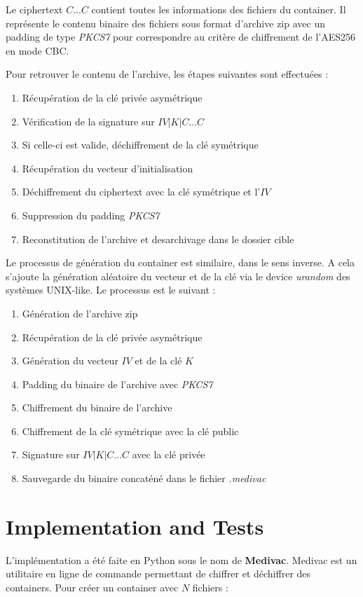 \documentclass[a4paper]{report}
\begin{document}
Le ciphertext $C...C$ contient toutes les informations des fichiers du container. Il représente le contenu binaire des fichiers sous format d'archive zip avec un padding de type \textit{PKCS7} pour correspondre au critère de chiffrement de l'AES256 en mode CBC.

Pour retrouver le contenu de l'archive, les étapes suivantes sont effectuées :

\begin{enumerate}
    \item{Récupération de la clé privée asymétrique}
    \item{Vérification de la signature sur $IV|K|C...C$}
    \item{Si celle-ci est valide, déchiffrement de la clé symétrique}
    \item{Récupération du vecteur d'initialisation}
    \item{Déchiffrement du ciphertext avec la clé symétrique et l'$IV$}
    \item{Suppression du padding \textit{PKCS7}}
    \item{Reconstitution de l'archive et desarchivage dans le dossier cible}
\end{enumerate}

Le processus de génération du container est similaire, dans le sens inverse. A cela s'ajoute la génération aléatoire du vecteur et de la clé via le device \textit{urandom} des systèmes UNIX-like. Le processus est le suivant :

\begin{enumerate}
    \item{Génération de l'archive zip}
    \item{Récupération de la clé privée asymétrique}
    \item{Génération du vecteur $IV$ et de la clé $K$}
    \item{Padding du binaire de l'archive avec \textit{PKCS7}}
    \item{Chiffrement du binaire de l'archive}
    \item{Chiffrement de la clé symétrique avec la clé public}
    \item{Signature sur $IV|K|C...C$ avec la clé privée}
    \item{Sauvegarde du binaire concaténé dans le fichier \textit{.medivac}}
\end{enumerate}

\chapter{Implementation and Tests}
L'implémentation a été faite en Python sous le nom de \textbf{Medivac}. Medivac est un utilitaire en ligne de commande permettant de chiffrer et déchiffrer des containers. Pour créer un container avec $N$ fichiers :
\end{document}
